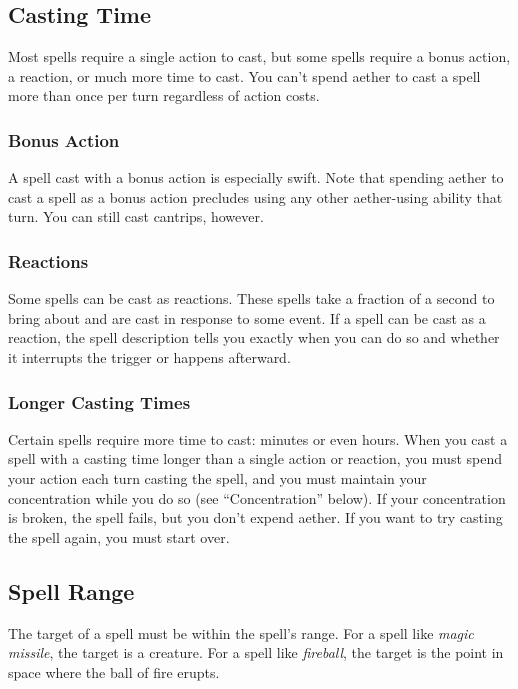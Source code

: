 \subsection{Casting Time}

Most spells require a single action to cast, but some spells require a bonus action, a reaction, or much more time to cast. You can't spend aether to cast a spell more than once per turn regardless of action costs.

\subsubsection{Bonus Action}

A spell cast with a bonus action is especially swift. Note that spending aether to cast a spell as a bonus action precludes using any other aether-using ability that turn. You can still cast cantrips, however.

\subsubsection{Reactions}

Some spells can be cast as reactions. These spells take a fraction of a second to bring about and are cast in response to some event. If a spell can be cast as a reaction, the spell description tells you exactly when you can do so and whether it interrupts the trigger or happens afterward.

\subsubsection{Longer Casting Times}

Certain spells require more time to cast: minutes or even hours. When you cast a spell with a casting time longer than a single action or reaction, you must spend your action each turn casting the spell, and you must maintain your concentration while you do so (see “Concentration” below). If your concentration is broken, the spell fails, but you don't expend aether. If you want to try casting the spell again, you must start over.

\subsection{Spell Range}

The target of a spell must be within the spell's range. For a spell like \textit{magic missile}, the target is a creature. For a spell like \textit{fireball}, the target is the point in space where the ball of fire erupts.

